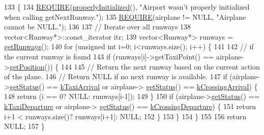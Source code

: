 \begin{DoxyCode}
133                                                        \{
134     \hyperlink{DesignByContract_8h_aeb774672b46dbe80afc14e0d1970f017}{REQUIRE}(\hyperlink{classAirport_a1ac3a730b557a36ac7521cce6ab64722}{properlyInitialized}(), \textcolor{stringliteral}{"Airport wasn't properly initialized when
       calling getNextRunway."});
135     \hyperlink{DesignByContract_8h_aeb774672b46dbe80afc14e0d1970f017}{REQUIRE}(airplane != NULL, \textcolor{stringliteral}{"Airplane cannot be NULL."});
136 
137     \textcolor{comment}{// Iterate over all runways}
138     vector<Runway*>::const\_iterator itr;
139     vector<Runway*> runways = \hyperlink{classAirport_a14310ffeba8a024105071c156fd42cf7}{getRunways}();
140     \textcolor{keywordflow}{for} (\textcolor{keywordtype}{unsigned} \textcolor{keywordtype}{int} i=0; i<runways.size(); i++) \{
141 
142         \textcolor{comment}{// if the current runway is found}
143         \textcolor{keywordflow}{if} (runways[i]->getTaxiPoint() == airplane->\hyperlink{classAirplane_ab4fa66c0adb05725a51524265f8c520c}{getPosition}()) \{
144 
145             \textcolor{comment}{// Return the next runway based on the current action of the plane.}
146             \textcolor{comment}{// Return NULL if no next runway is available.}
147             \textcolor{keywordflow}{if} (airplane->\hyperlink{classAirplane_a40bbb3024a476115700977c60bae2705}{getStatus}() == \hyperlink{Airplane_8h_a0e5bbf7c6c727baaba49062300fae19fabe52f2e86df226a44cc8ba29e8f259b2}{kTaxiArrival} or airplane->
      \hyperlink{classAirplane_a40bbb3024a476115700977c60bae2705}{getStatus}() == \hyperlink{Airplane_8h_a0e5bbf7c6c727baaba49062300fae19fac8a18187b65420ae9ceda0d5073512ce}{kCrossingArrival}) \{
148                 \textcolor{keywordflow}{return} (i == 0? NULL: runways[i-1]);
149             \}
150             \textcolor{keywordflow}{if} (airplane->\hyperlink{classAirplane_a40bbb3024a476115700977c60bae2705}{getStatus}() == \hyperlink{Airplane_8h_a0e5bbf7c6c727baaba49062300fae19fa3a6a40398243a8892b8084a9e0107015}{kTaxiDeparture} or airplane->
      \hyperlink{classAirplane_a40bbb3024a476115700977c60bae2705}{getStatus}() == \hyperlink{Airplane_8h_a0e5bbf7c6c727baaba49062300fae19fa53315b4aeb1d32cbe1f8b8aacd283f2d}{kCrossingDeparture}) \{
151                 \textcolor{keywordflow}{return} i+1 < runways.size()? runways[i+1]: NULL;
152             \}
153         \}
154     \}
155 
156     \textcolor{keywordflow}{return} NULL;
157 \}
\end{DoxyCode}
